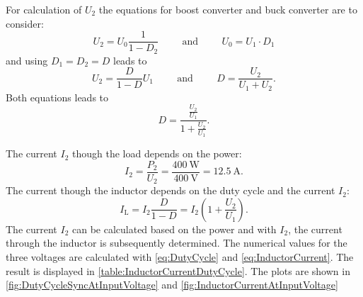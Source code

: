 \begin{solutionblock}
    For calculation of $U_\mathrm{2}$ the equations for boost converter and buck converter are to consider: 
    \begin{equation}
        U_\mathrm{2}=U_0 \frac{1}{1-D_\mathrm{2}} 
        \hspace{1cm} \mathrm{and} \hspace{1cm}  
        U_0=U_\mathrm{1} \cdot D_\mathrm{1}
    \end{equation}
    and using $D_\mathrm{1}=D_\mathrm{2}=D$ leads to
    \begin{equation}
        U_\mathrm{2}=\frac{D}{1-D} U_\mathrm{1}
        \hspace{1cm} \mathrm{and} \hspace{1cm}
        D=\frac{U_\mathrm{2}}{U_\mathrm{1}+U_\mathrm{2}}.
    \end{equation}
    Both equations leads to
    \begin{equation}
        D = \frac{\frac{U_\mathrm{2}}{U_\mathrm{1}}} {1+{\frac{U_\mathrm{2}}{U_\mathrm{1}}}}.
        \label{eq:DutyCycle}
    \end{equation}   
\end{solutionblock}

\begin{solutionblock}
    The current $I_\mathrm{2}$ though the load depends on the power:
    \begin{equation}
        I_\mathrm{2}=\frac{P_\mathrm{2}}{U_\mathrm{2}} = \frac{\SI{400}{\watt}}{\SI{400}{\volt}}=\SI{12.5}{\ampere}.
    \end{equation}
    The current though the inductor depends on the duty cycle and the current $I_\mathrm{2}$:
    \begin{equation}
        I_\mathrm{L}=I_\mathrm{2} \frac{D}{1-D} = I_\mathrm{2} \left(1+\frac{U_\mathrm{2}}{U_\mathrm{1}} \right).
        \label{eq:InductorCurrent}
    \end{equation}
    The current $I_\mathrm{2}$ can be calculated based on the power and with $I_\mathrm{2}$, 
    the current through the inductor is subsequently determined.
    The numerical values for the three voltages are calculated with \eqref{eq:DutyCycle} and \eqref{eq:InductorCurrent}.
    The result is displayed in \autoref{table:InductorCurrentDutyCycle}. The plots are shown in 
    \autoref{fig:DutyCycleSyncAtInputVoltage} and \autoref{fig:InductorCurrentAtInputVoltage}

    
    
    

\end{solutionblock}
 

